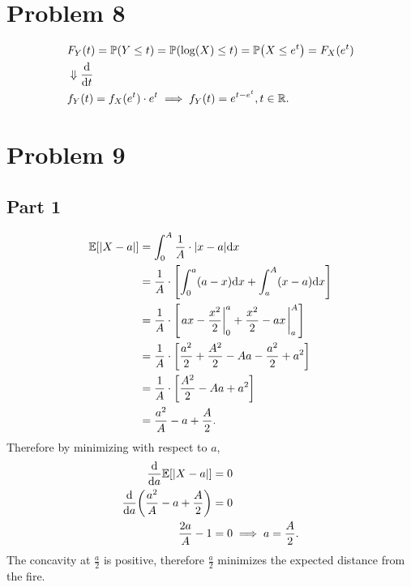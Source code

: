 \documentclass[12pt]{extarticle}
\begin{document}
\section*{Problem 8}
\begin{align*}
	&F_Y(t) = \mathbb{P}\qty(Y \leq t) = \mathbb{P}\qty(\log(X) \leq t)
					= \mathbb{P}\qty(X \leq e^t)
					= F_X (e^t) \\
	&\Downarrow \dv{t} \\
	&f_Y (t) = f_X (e^t) \cdot e^t \implies f_Y (t) = e^{t-e^t}, t \in \mathbb{R}
.\end{align*}

\section*{Problem 9}
\subsection*{Part 1}
\begin{align*}
	\Exp{|X - a|} &= \int_0^A \frac{1}{A} \cdot |x - a| \dd x \\
				  &= \frac{1}{A} \cdot \qty[
				  \int_0^a (a - x) \dd x + \int_a^A (x - a) \dd x
				  ] \\
				  &= \frac{1}{A} \cdot \qty[
				  \eval{ax - \frac{x^2}{2}}_0^a + \frac{x^2}{2} - ax \eval_a^A
				  ] \\
				  &= \frac{1}{A} \cdot \qty[
				  \frac{a^2}{2} + \frac{A^2}{2} - Aa - \frac{a^2}{2} + a^2
				  ] \\
				  &= \frac{1}{A} \cdot \qty[
				  \frac{A^2}{2} - Aa + a^2
				  ] \\
				  &= \frac{a^2}{A} - a + \frac{A}{2}
.\end{align*}
Therefore by minimizing with respect to $a$,
\begin{align*}
	\dv{a} \mathbb{E}\qty[|X-a|] &= 0 \\
	\dv{a} \qty(\frac{a^2}{A} - a + \frac{A}{2}) &= 0 \\
	\frac{2a}{A} - 1 &= 0 \implies a = \frac{A}{2}
.\end{align*}
The concavity at $\frac{a}{2}$ is positive, therefore $\frac{a}{2}$ minimizes the expected distance from the fire.
\end{document}
